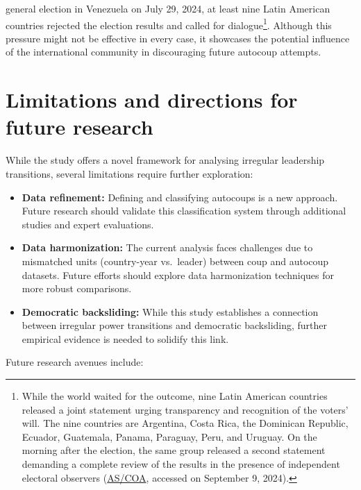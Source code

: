 \documentclass[
  12pt,
]{report}
\begin{document}
\begin{itemize}
  general election in Venezuela on July 29, 2024, at least nine Latin
  American countries rejected the election results and called for
  dialogue\footnote{While the world waited for the outcome, nine Latin
    American countries released a joint statement urging transparency
    and recognition of the voters' will. The nine countries are
    Argentina, Costa Rica, the Dominican Republic, Ecuador, Guatemala,
    Panama, Paraguay, Peru, and Uruguay. On the morning after the
    election, the same group released a second statement demanding a
    complete review of the results in the presence of independent
    electoral observers
    (\href{https://www.as-coa.org/articles/how-have-international-leaders-responded-venezuelas-2024-election}{AS/COA},
    accessed on September 9, 2024).}. Although this pressure might not
  be effective in every case, it showcases the potential influence of
  the international community in discouraging future autocoup attempts.
\end{itemize}

\section{Limitations and directions for future
research}\label{limitations-and-directions-for-future-research}

While the study offers a novel framework for analysing irregular
leadership transitions, several limitations require further exploration:

\begin{itemize}
\item
  \textbf{Data refinement:} Defining and classifying autocoups is a new
  approach. Future research should validate this classification system
  through additional studies and expert evaluations.
\item
  \textbf{Data harmonization:} The current analysis faces challenges due
  to mismatched units (country-year vs.~leader) between coup and
  autocoup datasets. Future efforts should explore data harmonization
  techniques for more robust comparisons.
\item
  \textbf{Democratic backsliding:} While this study establishes a
  connection between irregular power transitions and democratic
  backsliding, further empirical evidence is needed to solidify this
  link.
\end{itemize}

Future research avenues include:
\end{document}
